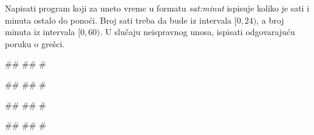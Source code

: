 \begin{Exercise}[label=KT_NG_06] 
Napisati program koji za uneto vreme u formatu \textit{sat:minut} ispisuje koliko je sati i minuta ostalo do ponoći. 
Broj sati treba da bude iz intervala $[0,24)$, a broj minuta iz intervala $[0,60)$. 
U slučaju neispravnog unosa, ispisati odgovarajuću poruku o grešci.

\begin{miditest}
\begin{upotreba}{1}
#\naslovInt#
##
#
\end{upotreba}
\end{miditest}
\begin{miditest}
\begin{upotreba}{2}
#\naslovInt#
##
#
\end{upotreba}
\end{miditest}

\begin{miditest}
\begin{upotreba}{3}
#\naslovInt#
##
#
\end{upotreba}
\end{miditest}
\begin{miditest}
\begin{upotreba}{4}
#\naslovInt#
##
#
\end{upotreba}
\end{miditest}

\end{Exercise}
\ifresenja
 \begin{Answer}[ref=KT_NG_06]
\end{Answer}
\fi


